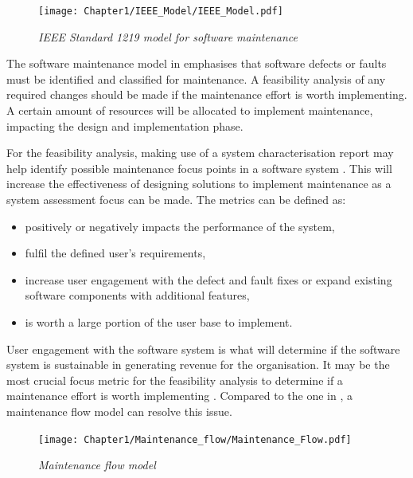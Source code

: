 \begin{figure}[!htb]
	\centering %
	\texttt{[image: Chapter1/IEEE\_Model/IEEE\_Model.pdf]}
	\caption[IEEE Standard 1219 model for software maintenance]
	{\textit{IEEE Standard 1219 model for software maintenance \cite{Ren2011}}} \label{fig:ch1_ieeeModel}
\end{figure}

The software maintenance model in  emphasises that software defects or faults must be identified and classified for maintenance. A feasibility analysis of any required changes should be made if the maintenance effort is worth implementing. A certain amount of resources will be allocated to implement maintenance, impacting the design and implementation phase.\par For the feasibility analysis, making use of a system characterisation report may help identify possible maintenance focus points in a software system \cite{Araujo2021}. This will increase the effectiveness of designing solutions to implement maintenance as a system assessment focus can be made. The metrics can be defined as:

\begin{itemize}
	\item positively or negatively impacts the performance of the system,
	\item fulfil the defined user's requirements,
	\item increase user engagement with the defect and fault fixes or expand existing software components with additional features,
	\item is worth a large portion of the user base to implement.
\end{itemize}

User engagement with the software system is what will determine if the software system is sustainable in generating revenue for the organisation. It may be the most crucial focus metric for the feasibility analysis to determine if a maintenance effort is worth implementing \cite{Araujo2021}. Compared to the one in , a maintenance flow model can resolve this issue.  

\begin{figure}[!htb]
	\centering %
	\texttt{[image: Chapter1/Maintenance\_flow/Maintenance\_Flow.pdf]}
	\caption[Maintenance flow model]
	{\textit{Maintenance flow model \cite{Tang2010}}} \label{fig:ch1_maintenanceFlow}
\end{figure}

